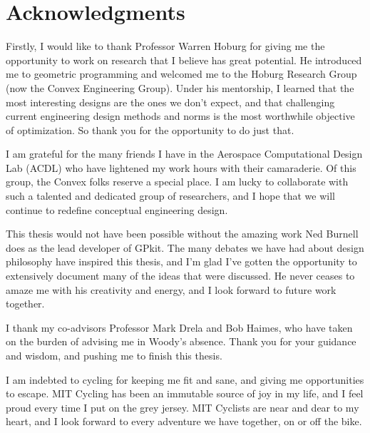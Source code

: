 % 

\cleardoublepage

\section*{Acknowledgments}

Firstly, I would like to thank Professor Warren Hoburg for giving me
the opportunity to work on research that I believe has great potential.
He introduced me to geometric programming and welcomed me to the Hoburg Research Group
(now the Convex Engineering Group). Under his mentorship, I learned that the most interesting designs
are the ones we don't expect, and that challenging current engineering design methods and norms
is the most worthwhile objective of optimization.
So thank you for the opportunity to do just that.

I am grateful for the many friends I have in the Aerospace Computational Design
Lab (ACDL) who have lightened my work hours with their camaraderie. Of this group,
the Convex folks reserve a special place. I am lucky to collaborate with
such a talented and dedicated group of researchers, and I hope that we will continue
to redefine conceptual engineering design.

This thesis would not have been possible without the amazing work Ned Burnell does
as the lead developer of GPkit. The many debates we have had about
design philosophy have inspired this thesis,
and I'm glad I've gotten the opportunity to extensively document many of the ideas
that were discussed.
He never ceases to amaze me with his creativity and energy, and I look
forward to future work together.

I thank my co-advisors Professor Mark Drela and Bob Haimes, who have taken on the burden of advising
me in Woody's absence. Thank you for your guidance and wisdom, and pushing me to
finish this thesis.

I am indebted to cycling for keeping me fit and sane, and giving me opportunities to
escape. MIT Cycling has been an immutable source of joy in my life, and I feel proud
every time I put on the grey jersey. MIT Cyclists are near and dear to my heart, and
I look forward to every adventure we have together, on or off the bike.


